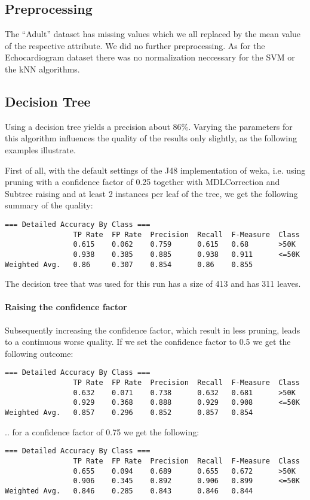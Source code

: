 \documentclass[paper=a4, fontsize=11pt]{scrartcl} %
\numberwithin{equation}{section} %
\numberwithin{figure}{section} %
\numberwithin{table}{section} %
\begin{document}
\subsection{Preprocessing}

The ``Adult'' dataset has missing values which we all replaced by the mean value of the respective attribute. We did no further preprocessing. As for the Echocardiogram dataset there was no normalization neccessary for the SVM or the kNN algorithms.


\subsection{Decision Tree}
Using a decision tree yields a precision about 86\%. Varying the parameters for this algorithm influences the quality of the results only slightly, as the following examples illustrate.

First of all, with the default settings of the J48 implementation of weka, i.e. using pruning with a confidence factor of 0.25 together with MDLCorrection and Subtree raising and at least 2 instances per leaf of the tree, we get the following summary of the quality:
 
\begin{lstlisting}
=== Detailed Accuracy By Class ===
                TP Rate  FP Rate  Precision  Recall  F-Measure  Class
                0.615    0.062    0.759      0.615   0.68       >50K
                0.938    0.385    0.885      0.938   0.911      <=50K
Weighted Avg.   0.86     0.307    0.854      0.86    0.855      
\end{lstlisting}

The decision tree that was used for this run has a size of 413 and has 311 leaves.

\paragraph{Raising the confidence factor}
Subsequently increasing the confidence factor, which result in less pruning, leads to a continuous worse quality. If we set the confidence factor to 0.5 we get the following outcome:
\begin{lstlisting}
=== Detailed Accuracy By Class ===
                TP Rate  FP Rate  Precision  Recall  F-Measure  Class
                0.632    0.071    0.738      0.632   0.681      >50K
                0.929    0.368    0.888      0.929   0.908      <=50K
Weighted Avg.   0.857    0.296    0.852      0.857   0.854      
\end{lstlisting}
.. for a confidence factor of 0.75 we get the following:
\begin{lstlisting}
=== Detailed Accuracy By Class ===
                TP Rate  FP Rate  Precision  Recall  F-Measure  Class
                0.655    0.094    0.689      0.655   0.672      >50K
                0.906    0.345    0.892      0.906   0.899      <=50K
Weighted Avg.   0.846    0.285    0.843      0.846   0.844     
\end{lstlisting}
\end{document}
